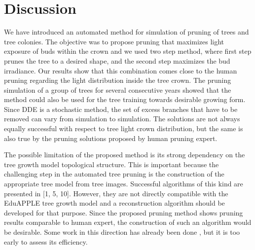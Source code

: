\documentclass[1p]{elsarticle}
\begin{document}
\section{Discussion}

We have introduced an automated method for simulation of pruning of
trees and tree colonies. The objective was to propose pruning that
maximizes light exposure of buds within the crown and we used two step
method, where first step prunes the tree to a desired shape, and the
second step maximizes the bud irradiance. Our results show that this
combination comes close to the human pruning regarding the light
distribution inside the tree crown. The pruning simulation of a group of
trees for several consecutive years showed that the method could also be
used for the tree training towards desirable growing form. Since DDE is
a stochastic method, the set of excess branches that have to be removed
can vary from simulation to simulation. The solutions are not always
equally successful with respect to tree light crown distribution, but
the same is also true by the pruning solutions proposed by human pruning
expert.

The possible limitation of the proposed method is its strong dependency
on the tree growth model topological structure. This is important
because the challenging step in the automated tree pruning is the
construction of the appropriate tree model from tree images. Successful
algorithms of this kind are presented in {[}1, 5, 10{]}. However, they
are not directly compatible with the EduAPPLE tree growth model and a
reconstruction algorithm should be developed for that purpose. Since the
proposed pruning method shows pruning results comparable to human
expert, the construction of such an algorithm would be desirable. Some
work in this direction has already been done \cite{kohek_estimation_2017}, but it is too
early to assess its efficiency.
\end{document}
